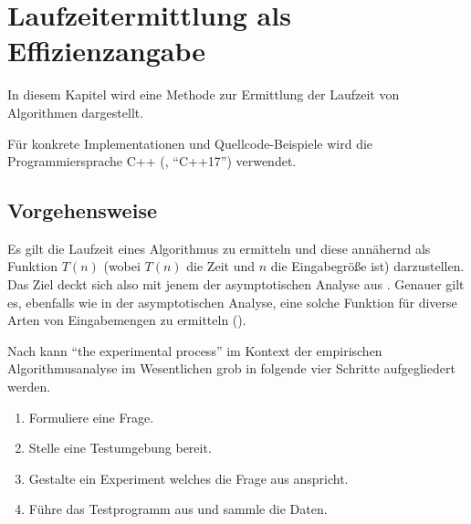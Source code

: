 \chapter{Laufzeitermittlung als Effizienzangabe}
\label{cha:praktische-effizienz}

In diesem Kapitel wird eine Methode zur Ermittlung der Laufzeit von Algorithmen dargestellt.

Für konkrete Implementationen und Quellcode-Beispiele wird die Programmiersprache C++ (\cite{ISO-C++17}, \enquote{C++17}) verwendet.


\section{Vorgehensweise}

Es gilt die Laufzeit eines Algorithmus zu ermitteln und diese annähernd als Funktion $T(n)$ (wobei $T(n)$ die Zeit und $n$ die Eingabegröße ist) darzustellen. Das Ziel deckt sich also mit jenem der asymptotischen Analyse aus . Genauer gilt es, ebenfalls wie in der asymptotischen Analyse, eine solche Funktion für diverse Arten von Eingabemengen zu ermitteln (\cite[27]{mcg2012}).

Nach \cite[10]{mcg2012} kann \enquote{the experimental process} im Kontext der empirischen Algorithmusanalyse im Wesentlichen grob in folgende vier Schritte aufgegliedert werden.

\begin{enumerate}
     \item Formuliere eine Frage.\label{itm:experiment-formulate-question}
     \item Stelle eine Testumgebung bereit.\label{itm:experiment-environment}
     \item Gestalte ein Experiment welches die Frage aus  anspricht.
     \item Führe das Testprogramm aus und sammle die Daten.
 \end{enumerate}


